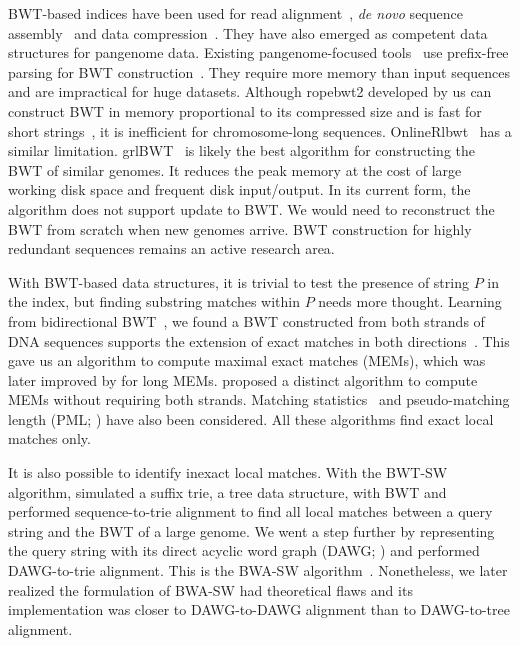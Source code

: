 \documentclass[webpdf,contemporary,large,namedate]{oup-authoring-template}%
\begin{document}
BWT-based indices have been used for read alignment~\citep{Langmead:2009aa,Li:2009uq,Li:2009aa},
\emph{de novo} sequence assembly~\citep{Simpson:2012aa} and data compression~\citep{Cox:2012ly}.
They have also emerged as competent data structures for pangenome data.
Existing pangenome-focused tools~\citep{Rossi:2022aa,Ahmed:2021aa,Zakeri:2024aa}
use prefix-free parsing for BWT construction~\citep{Boucher:2019aa}.
They require more memory than input sequences and are impractical for huge datasets.
Although ropebwt2 developed by us can construct BWT in memory proportional to its compressed size and is fast for short strings~\citep{Li:2014ab},
it is inefficient for chromosome-long sequences.
OnlineRlbwt~\citep{DBLP:journals/tcs/BannaiGI20} has a similar limitation.
grlBWT~\citep{DBLP:journals/iandc/DiazDominguezN23} is likely the best algorithm for constructing the BWT of similar genomes.
It reduces the peak memory at the cost of large working disk space and frequent disk input/output.
In its current form, the algorithm does not support update to BWT.
We would need to reconstruct the BWT from scratch when new genomes arrive.
BWT construction for highly redundant sequences remains an active research area.

With BWT-based data structures, it is trivial to test the presence of string $P$ in the index,
but finding substring matches within $P$ needs more thought.
Learning from bidirectional BWT~\citep{DBLP:conf/bibm/LamLTWWY09},
we found a BWT constructed from both strands of DNA sequences supports the extension of exact matches in both directions~\citep{Li:2012fk}.
This gave us an algorithm to compute maximal exact matches (MEMs), which was later improved by \citet{DBLP:conf/dlt/Gagie24} for long MEMs.
\citet{DBLP:journals/tcs/BannaiGI20} proposed a distinct algorithm to compute MEMs without requiring both strands.
Matching statistics~\citep{DBLP:journals/algorithmica/ChangL94} and pseudo-matching length (PML; \citealt*{Ahmed:2021aa}) have also been considered.
All these algorithms find exact local matches only.

It is also possible to identify inexact local matches.
With the BWT-SW algorithm, \citet{Lam:2008aa} simulated a suffix trie, a tree data structure, with BWT
and performed sequence-to-trie alignment to find all local matches
between a query string and the BWT of a large genome.
We went a step further by representing the query string with its direct acyclic word graph (DAWG; \citealt*{DBLP:journals/eatcs/BlumerBEHM83})
and performed DAWG-to-trie alignment.
This is the BWA-SW algorithm~\citep{Li:2010fk}.
Nonetheless, we later realized the formulation of BWA-SW had theoretical flaws
and its implementation was closer to DAWG-to-DAWG alignment than to DAWG-to-tree alignment.
\end{document}

